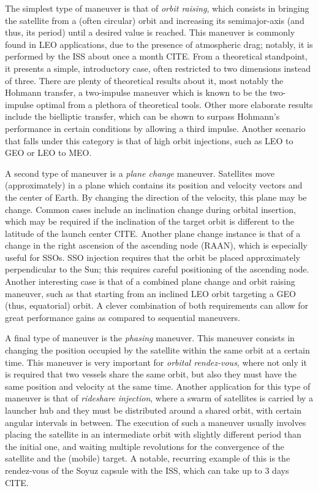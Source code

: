 The simplest type of maneuver is that of \textit{orbit raising}, which consists in bringing the satellite from a (often circular) orbit and increasing its semimajor-axis (and thus, its period) until a desired value is reached. This maneuver is commonly found in LEO applications, due to the presence of atmospheric drag; notably, it is performed by the ISS about once a month CITE\@. From a theoretical standpoint, it presents a simple, introductory case, often restricted to two dimensions instead of three. There are plenty of theoretical results about it, most notably the Hohmann transfer, a two-impulse maneuver which is known to be the two-impulse optimal from a plethora of theoretical tools. Other more elaborate results include the bielliptic transfer, which can be shown to surpass Hohmann's performance in certain conditions by allowing a third impulse. Another scenario that falls under this category is that of high orbit injections, such as LEO to GEO or LEO to MEO. 

A second type of maneuver is a \textit{plane change} maneuver. Satellites move (approximately) in a plane which contains its position and velocity vectors and the center of Earth. By changing the direction of the velocity, this plane may be change. Common cases include an inclination change during orbital insertion, which may be required if the inclination of the target orbit is different to the latitude of the launch center CITE\@. Another plane change instance is that of a change in the right ascension of the ascending node (RAAN), which is especially useful for SSOs. SSO injection requires that the orbit be placed approximately perpendicular to the Sun; this requires careful positioning of the ascending node. Another interesting case is that of a combined plane change and orbit raising maneuver, such as that starting from an inclined LEO orbit targeting a GEO (thus, equatorial) orbit. A clever combination of both requirements can allow for great performance gains as compared to sequential maneuvers.

A final type of maneuver is the \textit{phasing} maneuver. This maneuver consists in changing the position occupied by the satellite within the same orbit at a certain  time. This maneuver is very important for \textit{orbital rendez-vous}, where not only it is required that two vessels share the same orbit, but also they must have the same position and velocity at the same time. Another application for this type of maneuver is that of \textit{rideshare injection}, where a swarm of satellites is carried by a launcher hub and they must be distributed around a shared orbit, with certain angular intervals in between. The execution of such a maneuver usually involves placing the satellite in an intermediate orbit with slightly different period than the initial one, and waiting multiple revolutions for the convergence of the satellite and the (mobile) target. A notable, recurring example of this is the rendez-vous of the Soyuz capsule with the ISS, which can take up to 3 days CITE\@.

